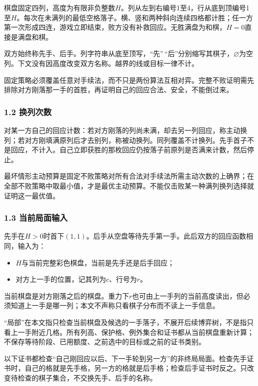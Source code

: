 \documentclass[
  a4paper,
]{article}
\providecommand{\tightlist}{%
  \setlength{\itemsep}{0pt}\setlength{\parskip}{0pt}}
\begin{document}
棋盘固定四列，高度为有限非负整数\(H\)。列从左到右编号1至4，行从底到顶编号1至\(H\)。每次在未满列的最低空格落子。横、竖和两种斜向连续四格都计胜；任一方第一次形成四连，游戏立即结束，败方没有补救回应。无胜满盘为和棋，\(H=0\)直接是满盘和棋。

双方始终称先手、后手。列字符串从底至顶写，``先''\,``后''分别缩写其棋子，\(\varnothing\)为空列。下文没有因高度改变双方名称。越界的线或目标一律不计。

固定策略必须覆盖任意对手续法，而不只是两份算法互相对弈。完整不败证明需先排除对方刚落那一手的首胜，再证明自己的回应合法、安全，不能倒过来。

\subsubsection{1.2 换列次数}\label{ux6362ux5217ux6b21ux6570}

对某一方自己的回应计数：若对方刚落的列尚未满，却去另一列回应，称主动换列；若对方刚填满原列后才去别列，称被动换列。同列覆盖不计换列。先手首子不是回应，不计入。自己立即获胜的那枚回应仍按落子前原列是否满来计数，然后停止。

最坏情形主动预算是固定不败策略对所有合法对手续法所需主动次数的上确界；在全部不败策略中取最小值，才是最优主动预算。不能仅击败某一种满列换列选择就证明这一最优值。

\subsubsection{1.3
当前局面输入}\label{ux5f53ux524dux5c40ux9762ux8f93ux5165}

先手在\(H>0\)时首下\((1,1)\)。后手从空盘等待先手第一手。此后双方的回应函数相同，输入为：

\begin{itemize}
\tightlist
\item
  \(H\)与当前完整彩色棋盘，当前是先手还是后手回应；
\item
  对方上一手的位置，记其列为\(c\)、行号为\(r\)。
\end{itemize}

当前棋盘是对方刚落之后的棋盘。重力下\(r\)也可由上一手列的当前高度读出，但必须知道上一手是哪一列；本文不声称只看棋子分布而不读上一手信息。

``局部''在本文指只检查当前棋盘及候选的一手落子，不展开后续博弈树，不是指只看上一手附近几格。所有列高、保护格、例外集合和证书都从当前棋盘重新计算；不保存等待阶段、已用额度、之前选中的目标或之前的证书类别。

以下证书都检查``自己刚回应以后、下一手轮到另一方''的非终局局面。检查先手证书时，自己的格就是先手格，另一方的格就是后手格；检查后手证书时反之。只改变待检查的棋子集合，不交换先手、后手的名称。
\end{document}
